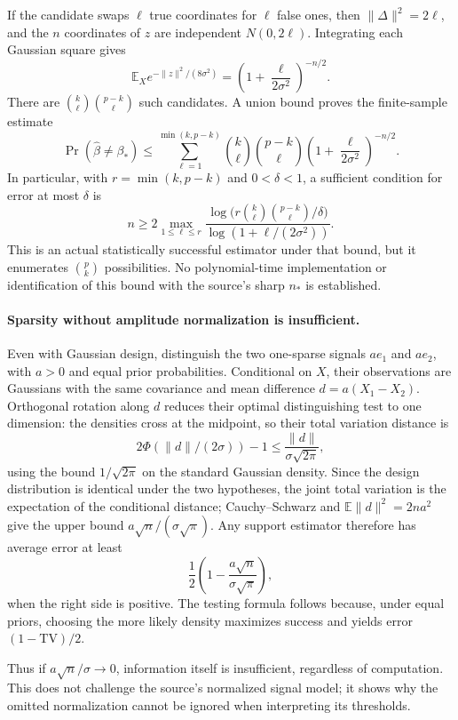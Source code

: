 \documentclass[11pt]{article}
\begin{document}
If the candidate swaps $\ell$ true coordinates for $\ell$ false ones, then $\|\Delta\|^2=2\ell$, and the $n$ coordinates of $z$ are independent $N(0,2\ell)$. Integrating each Gaussian square gives
\[
 \mathbb E_X e^{-\|z\|^2/(8\sigma^2)}
 =\left(1+\frac{\ell}{2\sigma^2}\right)^{-n/2}.
\]
There are $\binom k\ell\binom{p-k}\ell$ such candidates. A union bound proves the finite-sample estimate
\[
 \Pr(\widehat\beta\ne\beta_*)\le
 \sum_{\ell=1}^{\min(k,p-k)}
 \binom k\ell\binom{p-k}\ell
 \left(1+\frac{\ell}{2\sigma^2}\right)^{-n/2}.
\]
In particular, with $r=\min(k,p-k)$ and $0<\delta<1$, a sufficient condition for error at most $\delta$ is
\[
 n\ge2\max_{1\le\ell\le r}
 \frac{\log\bigl(r\binom k\ell\binom{p-k}\ell/\delta\bigr)}
      {\log(1+\ell/(2\sigma^2))}.
\]
This is an actual statistically successful estimator under that bound, but it enumerates $\binom pk$ possibilities. No polynomial-time implementation or identification of this bound with the source's sharp $n_*$ is established.

\paragraph{Sparsity without amplitude normalization is insufficient.}
Even with Gaussian design, distinguish the two one-sparse signals $a e_1$ and $a e_2$, with $a>0$ and equal prior probabilities. Conditional on $X$, their observations are Gaussians with the same covariance and mean difference $d=a(X_1-X_2)$. Orthogonal rotation along $d$ reduces their optimal distinguishing test to one dimension: the densities cross at the midpoint, so their total variation distance is
\[
 2\Phi(\|d\|/(2\sigma))-1
 \le \frac{\|d\|}{\sigma\sqrt{2\pi}},
\]
using the bound $1/\sqrt{2\pi}$ on the standard Gaussian density. Since the design distribution is identical under the two hypotheses, the joint total variation is the expectation of the conditional distance; Cauchy--Schwarz and $\mathbb E\|d\|^2=2na^2$ give the upper bound $a\sqrt n/(\sigma\sqrt\pi)$. Any support estimator therefore has average error at least
\[
 \frac12\left(1-\frac{a\sqrt n}{\sigma\sqrt\pi}\right),
\]
when the right side is positive. The testing formula follows because, under equal priors, choosing the more likely density maximizes success and yields error $(1-\mathrm{TV})/2$.

Thus if $a\sqrt n/\sigma\to0$, information itself is insufficient, regardless of computation. This does not challenge the source's normalized signal model; it shows why the omitted normalization cannot be ignored when interpreting its thresholds.
\end{document}
